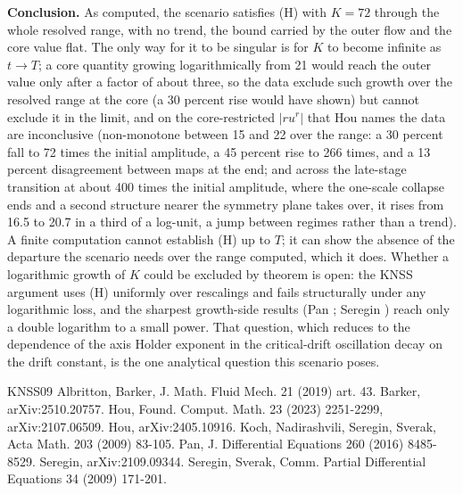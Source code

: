 \documentclass[11pt]{article}
\begin{document}
\medskip
\noindent\textbf{Conclusion.} As computed, the scenario satisfies (H) with $K = 72$ through the whole resolved range, with no trend, the bound carried by the outer flow and the core value flat. The only way for it to be singular is for $K$ to become infinite as $t \to T$; a core quantity growing logarithmically from 21 would reach the outer value only after a factor of about three, so the data exclude such growth over the resolved range at the core (a 30 percent rise would have shown) but cannot exclude it in the limit, and on the core-restricted $|r u^r|$ that Hou names the data are inconclusive (non-monotone between 15 and 22 over the range: a 30 percent fall to 72 times the initial amplitude, a 45 percent rise to 266 times, and a 13 percent disagreement between maps at the end; and across the late-stage transition at about 400 times the initial amplitude, where the one-scale collapse ends and a second structure nearer the symmetry plane takes over, it rises from 16.5 to 20.7 in a third of a log-unit, a jump between regimes rather than a trend). A finite computation cannot establish (H) up to $T$; it can show the absence of the departure the scenario needs over the range computed, which it does. Whether a logarithmic growth of $K$ could be excluded by theorem is open: the KNSS argument uses (H) uniformly over rescalings and fails structurally under any logarithmic loss, and the sharpest growth-side results (Pan \cite{P16}; Seregin \cite{S21}) reach only a double logarithm to a small power. That question, which reduces to the dependence of the axis Holder exponent in the critical-drift oscillation decay on the drift constant, is the one analytical question this scenario poses.

\begin{thebibliography}{KNSS09}
 Albritton, Barker, J. Math. Fluid Mech. 21 (2019) art. 43.
 Barker, arXiv:2510.20757.
 Hou, Found. Comput. Math. 23 (2023) 2251-2299, arXiv:2107.06509.
 Hou, arXiv:2405.10916.
 Koch, Nadirashvili, Seregin, Sverak, Acta Math. 203 (2009) 83-105.
 Pan, J. Differential Equations 260 (2016) 8485-8529.
 Seregin, arXiv:2109.09344.
 Seregin, Sverak, Comm. Partial Differential Equations 34 (2009) 171-201.
\end{thebibliography}
\end{document}

